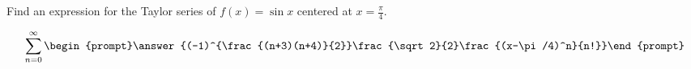 \documentclass{ximera}
\author{Gregory Hartman \and Matthew Carr}
\begin{document}
\begin{exercise}






Find an expression for the Taylor series of $f(x)=\sin x$ centered at $x=\frac{\pi}{4}$.

\[
\sum_{n=0}^{\infty}\begin{prompt}\answer{(-1)^{\frac{(n+3)(n+4)}{2}}\frac{\sqrt2}{2}\frac{(x-\pi/4)^n}{n!}}\end{prompt}
\]

\end{exercise}
\end{document}
